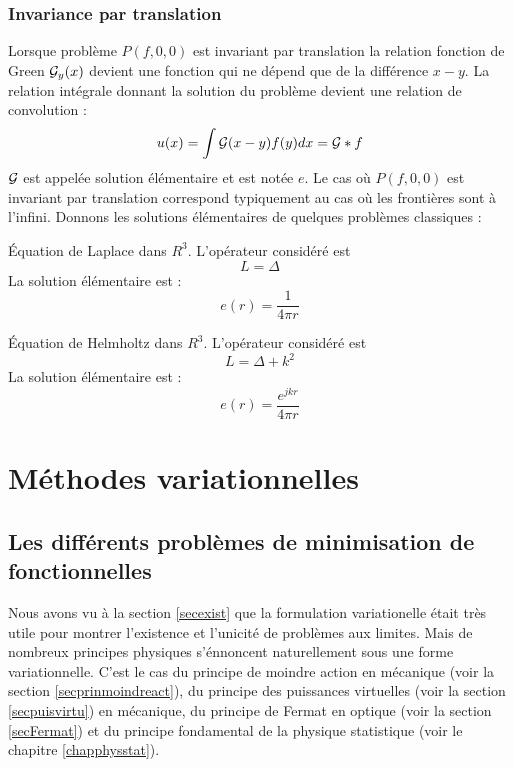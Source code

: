 \documentclass[12pt]{book}
\begin{document}
\subsubsection{Invariance par translation}
Lorsque probl\`eme $P(f,0,0)$ est invariant par translation
la relation fonction de Green ${\cal G}_y(x)$ devient
une fonction qui ne d\'epend que de la diff\'erence $x-y$.
La relation int\'egrale donnant la solution du probl\`eme
devient une relation de convolution :
\begin{equation}
u(x)=\int {\cal G}(x-y)f(y)dx={\cal G}*f
\end{equation}
${\cal G}$ est appel\'ee  solution \'el\'ementaire et est not\'ee $e$.
Le cas o\`u $P(f,0,0)$ est invariant par translation
correspond typiquement au cas o\`u les fronti\`eres sont  \`a
l'infini\cite{ma:distr:Petit91}. 
Donnons les solutions \'el\'ementaires de quelques probl\`emes
classiques :
\begin{exmp}
\'Equation de Laplace dans $R^3$. L'op\'erateur consid\'er\'e est 
\begin{equation}
L=\Delta
\end{equation}
La solution \'el\'ementaire est :
\begin{equation}
e(r)=\frac{1}{4\pi r}
\end{equation}
\end{exmp}
\begin{exmp}
\'Equation de Helmholtz dans $R^3$. L'op\'erateur consid\'er\'e est 
\begin{equation}
L=\Delta+k^2
\end{equation}
La solution \'el\'ementaire est :
\begin{equation}
e(r)=\frac{e^{jkr}}{4\pi r}
\end{equation}
\end{exmp}

\section{M\'ethodes variationnelles}\label{chapmetvar}
\subsection{Les diff\'erents probl\`emes de minimisation de fonctionnelles}
Nous avons vu \`a la section \ref{secexist} que la formulation
variationelle \'etait tr\`es utile pour montrer l'existence et
l'unicit\'e de probl\`emes aux limites.
Mais de nombreux principes physiques s'\'ennoncent naturellement sous une
forme variationnelle. 
C'est le cas du principe de moindre action en m\'ecanique (voir la section
 \ref{secprinmoindreact}), du principe des puissances virtuelles (voir la
section  \ref{secpuisvirtu}) en m\'ecanique, du principe de
Fermat en optique (voir la section \ref{secFermat}) et du principe fondamental
de la physique statistique (voir le chapitre \ref{chapphysstat}).
\end{document}

